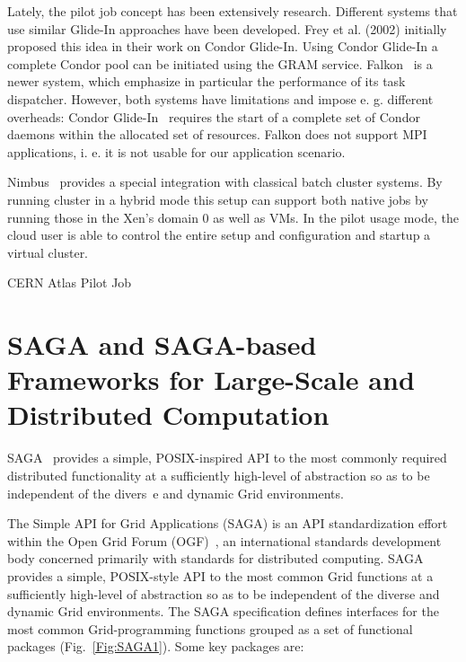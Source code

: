 \documentclass[conference,final]{IEEEtran}
\begin{document}

Lately, the pilot job concept has been extensively research.
Different systems that use similar Glide-In approaches have been
developed. Frey et al. (2002) initially proposed this idea in their
work on Condor Glide-In. Using Condor Glide-In a complete Condor pool
can be initiated using the GRAM service. Falkon~\cite{1362680} is a
newer system, which emphasize in particular the performance of its
task dispatcher. However, both systems have limitations and impose
e. g. different overheads: Condor Glide-In~\cite{citeulike:291860}
requires the start of a complete set of Condor daemons within the
allocated set of resources. Falkon does not support MPI applications,
i. e. it is not usable for our application scenario.

Nimbus~\cite{10.1109/MIC.2009.94} provides a special integration with
classical batch cluster systems. By running cluster in a hybrid mode
this setup can support both native jobs by running those in the Xen's
domain 0 as well as VMs. In the pilot usage mode, the cloud user is
able to control the entire setup and configuration and startup a
virtual cluster.

CERN Atlas Pilot Job~\cite{1555338}

\section{SAGA and SAGA-based Frameworks for Large-Scale and Distributed Computation}

SAGA~\cite{saga_url} provides a simple, POSIX-inspired API to the most
commonly required distributed functionality at a sufficiently
high-level of abstraction so as to be independent of the divers\ e and
dynamic Grid environments.

The Simple API for Grid Applications (SAGA) is an API standardization
effort within the Open Grid Forum (OGF)~\cite{ogf_web}, an
international standards development body concerned primarily with
standards for distributed computing. SAGA provides a simple,
POSIX-style API to the most common Grid functions at a sufficiently
high-level of abstraction so as to be independent of the diverse and
dynamic Grid environments. The SAGA specification defines interfaces
for the most common Grid-programming functions grouped as a set of
functional packages (Fig.~\ref{Fig:SAGA1}). Some key packages are:
\end{document}
